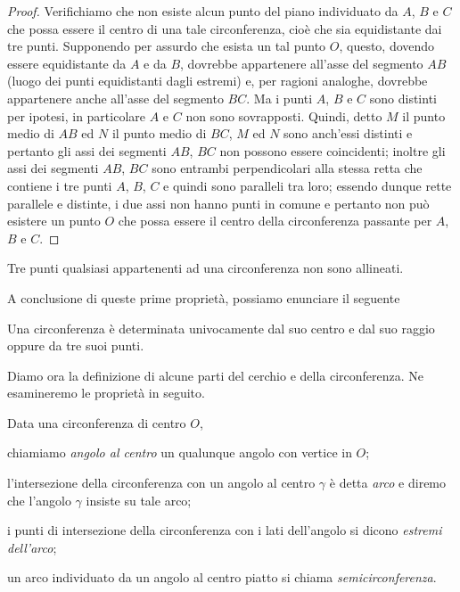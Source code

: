 \begin{proof}
Verifichiamo che non esiste alcun punto del piano individuato da $A$, $B$ e $C$ che possa essere il centro di una tale circonferenza, cioè che sia equidistante dai tre punti.
Supponendo per assurdo che esista un tal punto $O$, questo, dovendo essere equidistante da $A$ e da $B$, dovrebbe appartenere all'asse del segmento $AB$ (luogo dei punti equidistanti dagli estremi) e, per ragioni analoghe, dovrebbe appartenere anche all'asse del segmento $BC$. Ma i punti $A$, $B$ e $C$ sono distinti per ipotesi, in particolare $A$ e $C$ non sono sovrapposti. Quindi, detto $M$ il punto medio di $AB$ ed $N$ il punto medio di $BC$, $M$ ed $N$ sono anch'essi distinti e pertanto gli assi dei segmenti $AB$, $BC$ non possono essere coincidenti; inoltre gli assi dei segmenti $AB$, $BC$ sono entrambi perpendicolari alla stessa retta che contiene i tre punti $A$, $B$, $C$ e quindi sono paralleli tra loro; essendo dunque rette parallele e distinte, i due assi non hanno punti in comune e pertanto non può esistere un punto $O$ che possa essere il centro della circonferenza passante per $A$, $B$ e $C$.
\end{proof}

\begin{corollario}
Tre punti qualsiasi appartenenti ad una circonferenza non sono allineati.
\end{corollario}

A conclusione di queste prime proprietà, possiamo enunciare il seguente
\begin{corollario}
Una circonferenza è determinata univocamente dal suo centro e dal suo raggio oppure da tre suoi punti.
\end{corollario}

Diamo ora la definizione di alcune parti del cerchio e della circonferenza. Ne esamineremo le proprietà in seguito.
\begin{definizione}
Data una circonferenza di centro $O$,
\begin{itemize*}
\item chiamiamo \emph{angolo al centro} un qualunque angolo con vertice in $O$;
\item l'intersezione della circonferenza con un angolo al centro $\gamma$ è detta \emph{arco} e diremo che l'angolo $\gamma$ insiste su tale arco;
\item i punti di intersezione della circonferenza con i lati dell'angolo si dicono \emph{estremi dell'arco};
\item un arco individuato da un angolo al centro piatto si chiama \emph{semicirconferenza}.
\end{itemize*}
\end{definizione}

